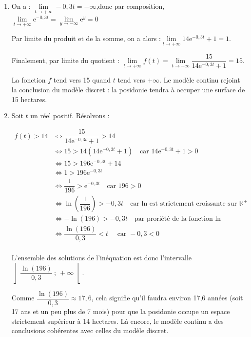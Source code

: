 \documentclass[10pt]{article}
\providecommand{\R}{\mathbb{R}}
\providecommand{\e}{{\mathrm{e}}}
\begin{document}
\begin{enumerate}
	La seule fonction solution de $(E_2)$ vérifiant $g(0) = 1$ est donc

	$g : t \longmapsto \dfrac{14}{15} \e^{-0,3t} + \dfrac{1}{15}$.

	On en déduit donc que, pour tout $t$ réel positif, on a :\quad
	$\begin{aligned}[t]
		f(t) &=\dfrac{1}{g(t)}\\
			&= \dfrac{1}{\dfrac{14}{15} \e^{-0,3t} + \dfrac{1}{15}}\\
			&= \dfrac{15}{14 \e^{-0,3t} + 1}\\
	\end{aligned} $

	On arrive bien à l'expression annoncée.

	\item On a : \quad $\lim\limits_{t \to +\infty} -0,3t = -\infty$,\quad donc par composition, $\lim\limits_{t \to +\infty} \e^{-0,3t} = \lim\limits_{y\to -\infty} \e^{y} = 0$

	Par limite du produit et de la somme, on a alors :\quad $\lim\limits_{t \to +\infty} 14\e^{-0,3t} + 1  =1$.

	Finalement, par limite du quotient : \quad $\lim\limits_{t \to +\infty} f(t) = \lim\limits_{t \to +\infty} \dfrac{15}{14\e^{-0,3t} + 1}  =15$.

	La fonction $f$ tend vers 15 quand $t$ tend vers $+\infty$. Le modèle continu rejoint la conclusion du modèle discret : la posidonie tendra à occuper une surface de 15 hectares.

	\item Soit $t$ un réel positif. Résolvons :

	$\begin{aligned}
		f(t) > 14
			&\iff \dfrac{15}{14\e^{-0,3t} + 1} > 14\\
			&\iff 15 > 14(14\e^{-0,3t} + 1) \quad \text{car } 14\e^{-0,3t} + 1 > 0\\
			&\iff 15 > 196 \e^{-0,3t} + 14\\
			&\iff 1 > 196 \e^{-0,3t}\\
			&\iff \dfrac{1}{196} > \e^{-0,3t} \quad \text{car } 196 >0\\
			&\iff \ln\left(\dfrac{1}{196}\right) > -0,3t \quad \text{car ln est strictement croissante sur } \R^+\\
			&\iff -\ln\left(196\right) > -0,3t \quad \text{par proriété de la fonction ln}\\
			&\iff \dfrac{\ln(196)}{0,3} < t \quad \text{ car } -0,3 < 0\\
	\end{aligned}$

	L'ensemble des solutions de l'inéquation est donc l'intervalle $\left]\dfrac{\ln(196)}{0,3}~;~+\infty\right[ $.

	Comme $ \dfrac{\ln(196)}{0,3}\approx 17,6$, cela signifie qu'il faudra environ 17,6 années (soit 17 ans et un peu plus de 7 mois) pour que la posidonie occupe un espace strictement supérieur à 14 hectares. Là encore, le modèle continu a des conclusions cohérentes avec celles du modèle discret.

\end{enumerate}
\end{document}
